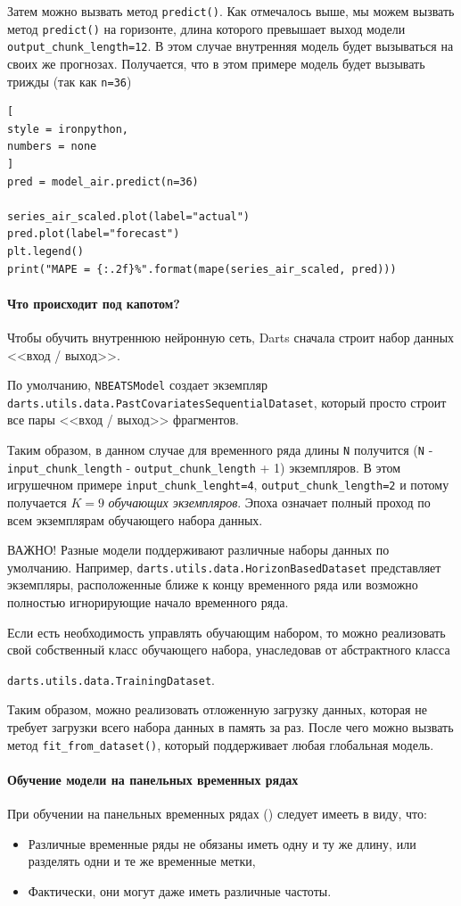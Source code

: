 \documentclass[%
	11pt,
	a4paper,
	utf8,
		]{article}
\begin{document}
Затем можно вызвать метод \verb|predict()|. Как отмечалось выше, мы можем вызвать метод \verb|predict()| на горизонте, длина которого превышает выход модели \verb|output_chunk_length=12|. В этом случае внутренняя модель будет вызываться на своих же прогнозах. Получается, что в этом примере модель будет вызывать трижды (так как \verb|n=36|)
\begin{lstlisting}[
style = ironpython,
numbers = none
]
pred = model_air.predict(n=36)

series_air_scaled.plot(label="actual")
pred.plot(label="forecast")
plt.legend()
print("MAPE = {:.2f}%".format(mape(series_air_scaled, pred)))
\end{lstlisting}

\paragraph{Что происходит под капотом?} Чтобы обучить внутреннюю нейронную сеть, Darts сначала строит набор данных <<вход / выход>>.

По умолчанию, \verb|NBEATSModel| создает экземпляр \verb|darts.utils.data.PastCovariatesSequentialDataset|, который просто строит все пары <<вход / выход>> фрагментов.

Таким образом, в данном случае для временного ряда длины \verb|N| получится (\verb|N| - \verb|input_chunk_length| - \verb|output_chunk_length| + 1) экземпляров. В этом игрушечном примере \verb|input_chunk_lenght=4|, \verb|output_chunk_length=2| и потому получается $ K = 9 $ \emph{обучающих экземпляров}. Эпоха означает полный проход по всем экземплярам обучающего набора данных.

ВАЖНО! Разные модели поддерживают различные наборы данных по умолчанию. Например, \verb|darts.utils.data.HorizonBasedDataset| представляет экземпляры, расположенные ближе к концу временного ряда или возможно полностью игнорирующие начало временного ряда.

Если есть необходимость управлять обучающим набором, то можно реализовать свой собственный класс обучающего набора, унаследовав от абстрактного класса

\verb|darts.utils.data.TrainingDataset|.

Таким образом, можно реализовать отложенную загрузку данных, которая не требует загрузки всего набора данных в память за раз. После чего можно вызвать метод \verb|fit_from_dataset()|, который поддерживает любая глобальная модель.

\paragraph{Обучение модели на панельных временных рядах} При обучении на панельных временных рядах () следует имееть в виду, что:
\begin{itemize}
	\item Различные временные ряды не обязаны иметь одну и ту же длину, или разделять одни и те же временные метки,
	
	\item Фактически, они могут даже иметь различные частоты.
\end{itemize}
\end{document}
